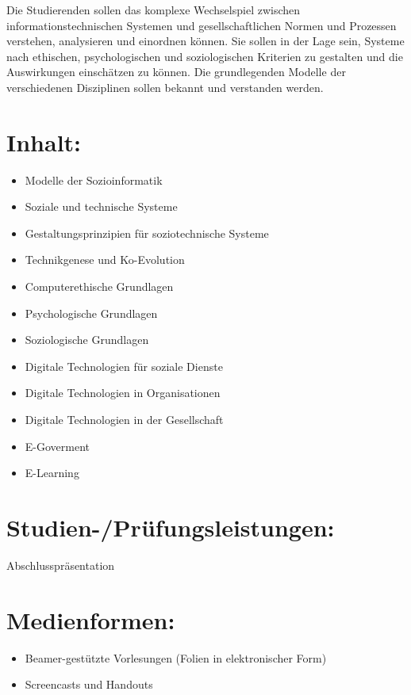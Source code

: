 Die Studierenden sollen das komplexe Wechselspiel zwischen
informationstechnischen Systemen und gesellschaftlichen Normen und
Prozessen verstehen, analysieren und einordnen können. Sie sollen in der
Lage sein, Systeme nach ethischen, psychologischen und soziologischen
Kriterien zu gestalten und die Auswirkungen einschätzen zu können. Die
grundlegenden Modelle der verschiedenen Disziplinen sollen bekannt und
verstanden werden.

\section{Inhalt:}\label{inhalt-24}

\begin{itemize}
\tightlist
\item
  Modelle der Sozioinformatik
\item
  Soziale und technische Systeme
\item
  Gestaltungsprinzipien für soziotechnische Systeme
\item
  Technikgenese und Ko-Evolution
\item
  Computerethische Grundlagen
\item
  Psychologische Grundlagen
\item
  Soziologische Grundlagen
\item
  Digitale Technologien für soziale Dienste
\item
  Digitale Technologien in Organisationen
\item
  Digitale Technologien in der Gesellschaft
\item
  E-Goverment
\item
  E-Learning
\end{itemize}

\section{Studien-/Prüfungsleistungen:}\label{studien-pruxfcfungsleistungen-24}

Abschlusspräsentation

\section{Medienformen:}\label{medienformen-24}

\begin{itemize}
\tightlist
\item
  Beamer-gestützte Vorlesungen (Folien in elektronischer Form)
\item
  Screencasts und Handouts
\end{itemize}

